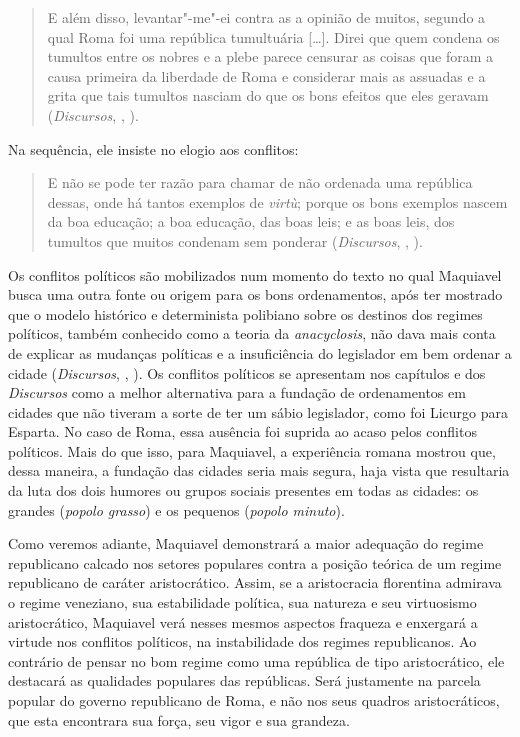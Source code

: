 \begin{quote}
E além disso, levantar"-me"-ei contra as a opinião de muitos, segundo a
qual Roma foi uma república tumultuária {[}\ldots{}{]}. Direi que quem
condena os tumultos entre os nobres e a plebe parece censurar as coisas
que foram a causa primeira da liberdade de Roma e considerar mais as
assuadas e a grita que tais tumultos nasciam do que os bons efeitos que
eles geravam (\emph{Discursos}, , ).
\end{quote}

Na sequência, ele insiste no elogio aos conflitos:

\begin{quote}
E não se pode ter razão para chamar de não ordenada uma república
dessas, onde há tantos exemplos de \emph{virtù}; porque os bons exemplos
nascem da boa educação; a boa educação, das boas leis; e as boas leis,
dos tumultos que muitos condenam sem ponderar (\emph{Discursos}, ,
).
\end{quote}

Os conflitos políticos são mobilizados num momento do texto no qual
Maquiavel busca uma outra fonte ou origem para os bons ordenamentos,
após ter mostrado que o modelo histórico e determinista polibiano sobre
os destinos dos regimes políticos, também conhecido como a teoria da
\emph{anacyclosis}, não dava mais conta de explicar as mudanças
políticas e a insuficiência do legislador em bem ordenar a cidade
(\emph{Discursos}, , ). Os conflitos políticos se apresentam nos
capítulos  e  dos \emph{Discursos} como a melhor alternativa para a
fundação de ordenamentos em cidades que não tiveram a sorte de ter um
sábio legislador, como foi Licurgo para Esparta. No caso de Roma, essa
ausência foi suprida ao acaso pelos conflitos políticos. Mais do que
isso, para Maquiavel, a experiência romana mostrou que, dessa maneira, a
fundação das cidades seria mais segura, haja vista que resultaria da
luta dos dois humores ou grupos sociais presentes em todas as cidades:
os grandes (\emph{popolo grasso}) e os pequenos (\emph{popolo minuto}).

Como veremos adiante, Maquiavel demonstrará a maior adequação do regime
republicano calcado nos setores populares contra a posição teórica de um
regime republicano de caráter aristocrático. Assim, se a aristocracia
florentina admirava o regime veneziano, sua estabilidade política, sua
natureza e seu virtuosismo aristocrático, Maquiavel verá nesses mesmos
aspectos fraqueza e enxergará a virtude nos conflitos políticos, na
instabilidade dos regimes republicanos. Ao contrário de pensar no bom
regime como uma república de tipo aristocrático, ele destacará as
qualidades populares das repúblicas. Será justamente na parcela popular
do governo republicano de Roma, e não nos seus quadros aristocráticos,
que esta encontrara sua força, seu vigor e sua grandeza.

